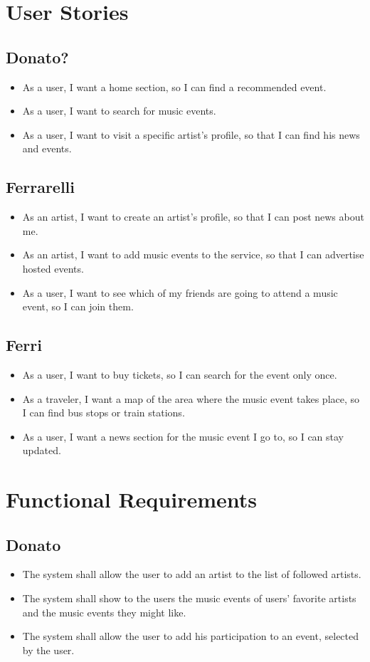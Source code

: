 \documentclass[11pt,a4paper]{article}
\begin{document}
\section{User Stories}
\subsection{Donato?}
\begin{itemize}
\item As a user, I want a home section, so I can find a recommended event. 
\item As a user, I want to search for music events.
\item As a user, I want to visit a specific artist’s profile, so that I can find his news and events.
\end{itemize}
\subsection{Ferrarelli}
\begin{itemize}
\item As an artist, I want to create an artist’s profile, so that I can post news about me.
\item As an artist, I want to add music events to the service, so that I can advertise hosted events.
\item As a user, I want to see which of my friends are going to attend a music event, so I can join them.
\end{itemize}
\subsection{Ferri}
\begin{itemize}
\item As a user, I want to buy tickets, so I can search for the event only once.
\item As a traveler, I want a map of the area where the music event takes place, so I can
find bus stops or train stations. 
\item As a user, I want a news section for the music event I go to, so I can stay updated.
\end{itemize}
\section{Functional Requirements}
\subsection{Donato}
\begin{itemize}
\item The system shall allow the user to add an artist to the list of followed artists.
\item The system shall show to the users the music events of users’ favorite artists and the music events they might like.
\item The system shall allow the user to add his participation to an event, selected by the user.
\end{itemize}
\end{document}
